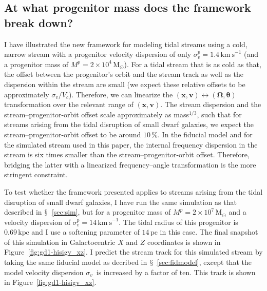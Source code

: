 \documentclass{emulateapj}
\renewcommand{\figurename}{Figure}
\newcommand{\sectionname}{$\mathsection$}
\renewcommand{\vec}[1]{\ensuremath{\mathbf{#1}}}
\newcommand{\vecx}{\ensuremath{\vec{x}}}
\newcommand{\vecv}{\ensuremath{\vec{v}}}
\newcommand{\veco}{\ensuremath{\vec{\Omega}}}
\newcommand{\veca}{\ensuremath{\boldsymbol\theta}}
\newcommand{\sigv}{\ensuremath{\sigma_v}}
\newcommand{\kpc}{\ensuremath{\,\mathrm{kpc}}}
\newcommand{\pc}{\ensuremath{\,\mathrm{pc}}}
\newcommand{\kms}{\ensuremath{\,\mathrm{km\ s}^{-1}}}
\newcommand{\msun}{\ensuremath{\,\mathrm{M}_{\odot}}}
\begin{document}
\subsection{At what progenitor mass does the framework break down?}

I have illustrated the new framework for modeling tidal streams using
a cold, narrow stream with a progenitor velocity dispersion of only
$\sigma_v^p = 1.4\kms$ (and a progenitor mass of $M^p = 2 \times
10^4\msun$). For a tidal stream that is as cold as that, the offset
between the progenitor's orbit and the stream track as well as the
dispersion within the stream are small (we expect these relative
offsets to be approximately $\sigv/V_c$). Therefore, we can linearize
the $(\vecx,\vecv) \leftrightarrow (\veco,\veca)$ transformation over
the relevant range of $(\vecx,\vecv)$.  The stream dispersion and the
stream--progenitor-orbit offset scale approximately as mass$^{1/3}$,
such that for streams arising from the tidal disruption of small dwarf
galaxies, we expect the stream--progenitor-orbit offset to be around
$10\,\%$. In the fiducial model and for the simulated stream used in
this paper, the internal frequency dispersion in the stream is six
times smaller than the stream--progenitor-orbit offset. Therefore,
bridging the latter with a linearized frequency--angle transformation
is the more stringent constraint.

To test whether the framework presented applies to streams arising
from the tidal disruption of small dwarf galaxies, I have run the same
simulation as that described in \sectionname~\ref{sec:sim}, but for a
progenitor mass of $M^p=2\times 10^7\msun$ and a velocity dispersion
of $\sigma_v^p=14\kms$. The tidal radius of this progenitor is
$0.69\kpc$ and I use a softening parameter of $14\pc$ in this
case. The final snapshot of this simulation in Galactocentric $X$ and
$Z$ coordinates is shown in \figurename~\ref{fig:gd1-hisigv_xz}. I
predict the stream track for this simulated stream by taking the same
fiducial model as decribed in \sectionname~\ref{sec:fidmodel}, except
that the model velocity dispersion \sigv\ is increased by a factor of
ten. This track is shown in \figurename~\ref{fig:gd1-hisigv_xz}.
\end{document}
